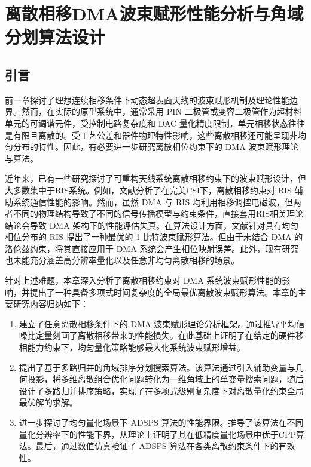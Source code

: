 \chapter{离散相移DMA波束赋形性能分析与角域分划算法设计}\label{ch:ddma}


\section{引言}\label{sec:ddma_intro}

前一章探讨了理想连续相移条件下动态超表面天线的波束赋形机制及理论性能边界。然而，在实际的原型系统中，通常采用 PIN 二极管或变容二极管作为超材料单元的可调谐元件，受控制电路复杂度和 DAC 量化精度限制，单元相移状态往往是有限且离散的。受工艺公差和器件物理特性影响，这些离散相移还可能呈现非均匀分布的特性。因此，有必要进一步研究离散相位约束下的 DMA 波束赋形理论与算法。

近年来，已有一些研究探讨了可重构天线系统离散相移约束下的波束赋形设计，但大多数集中于RIS系统。例如，文献分析了在完美CSI下，离散相移约束对 RIS 辅助系统通信性能的影响。然而，虽然 DMA 与 RIS 均利用相移调控电磁波，但两者不同的物理结构导致了不同的信号传播模型与约束条件，直接套用RIS相关理论结论会导致 DMA 架构下的性能评估失真。在算法设计方面，文献针对具有均匀相位分布的 RIS 提出了一种最优的 1 比特波束赋形算法。但由于未结合 DMA 的洛伦兹约束，将其直接应用于 DMA 系统会产生相位映射误差。此外，现有研究也未能充分涵盖高分辨率量化以及任意非均匀离散相移的场景。

针对上述难题，本章深入分析了离散相移约束对 DMA 系统波束赋形性能的影响，并提出了一种具备多项式时间复杂度的全局最优离散波束赋形算法。本章的主要研究内容归纳如下：

\begin{enumerate}
	\item 建立了任意离散相移条件下的 DMA 波束赋形理论分析框架。通过推导平均信噪比定量刻画了离散相移带来的性能损失。在此基础上证明了在给定的硬件移相能力约束下，均匀量化策略能够最大化系统波束赋形增益。
	
	\item 提出了基于多路归并的角域排序分划搜索算法。该算法通过引入辅助变量与几何投影，将多维离散组合优化问题转化为一维角域上的单变量搜索问题，随后设计了多路归并排序策略，实现了在多项式级别复杂度下对离散量化约束全局最优解的求解。
	
	\item 进一步探讨了均匀量化场景下 ADSPS 算法的性能界限。推导了该算法在不同量化分辨率下的性能下界，从理论上证明了其在低精度量化场景中优于CPP算法。最后，通过数值仿真验证了 ADSPS 算法在各类离散约束条件下的有效性。
\end{enumerate}

